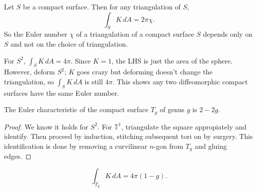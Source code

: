   \begin{theorem}
      Let $S$ be a compact surface. Then for any triangulation of $S$, \[
      \int_S K \,dA=2\pi \chi.
      \] So the Euler number $\chi$ of a triangulation of a compact surface $S$ depends only on $S$ and not on the choice of triangulation.
  \end{theorem}
  \begin{example}
     For $S^2$, $\int_S K\,dA=4\pi$.  Since $K=1$, the LHS is just the area of the sphere. However, deform $S^2$; $K$ goes crazy but deforming doesn't change the triangulation, so $\int_S K\,dA$ is still $4\pi$. This shows any two diffeomorphic compact surfaces have the same Euler number.
  \end{example}
  \begin{theorem}
      The Euler characteristic of the compact surface $T_g$ of genus $g$ is $2-2g$.
  \end{theorem}
  \begin{proof}
      We know it holds for $S^2$. For $\mathbb{T}^1$, triangulate the square appropiately and identify. Then proceed by induction, stitching subsequent tori on by surgery. This identification is done by removing a curvilinear $n$-gon from $T_g$ and gluing edges.
  \end{proof}
  \begin{cor}
      \[
          \int _{T_g}K\,dA=4\pi (1-g).
      \] 
  \end{cor}

